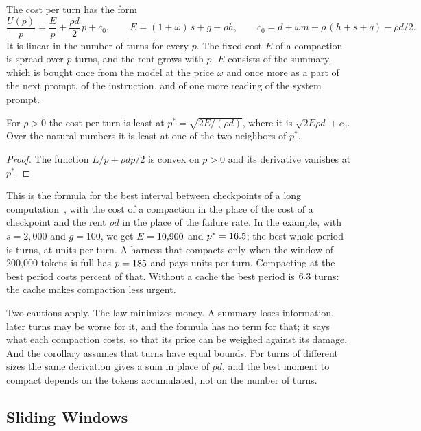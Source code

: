 \documentclass[acmsmall,nonacm,screen]{acmart}
\begin{document}
The cost per turn has the form
\[
\frac{U(p)}{p} = \frac{E}{p} + \frac{\rho d}{2}\,p + c_0,
\qquad E = (1+\omega)\,s + g + \rho h,
\qquad c_0 = d + \omega m + \rho\,(h + s + q) - \rho d/2 .
\]
It is linear in the number of turns for every $p$. The fixed cost $E$ of a compaction is
spread over $p$ turns, and the rent grows with $p$. $E$ consists of the summary, which is
bought once from the model at the price $\omega$ and once more as a part of the next prompt,
of the instruction, and of one more reading of the system prompt.

\begin{corollary}
\label{cor:sqrt}
For $\rho > 0$ the cost per turn is least at $p^* = \sqrt{2E/(\rho d)}$, where it is
$\sqrt{2E\rho d} + c_0$. Over the natural numbers it is least at one of the two neighbors of
$p^*$.
\end{corollary}

\begin{proof}
The function $E/p + \rho dp/2$ is convex on $p > 0$ and its derivative vanishes at $p^*$.
\end{proof}

This is the formula for the best interval between checkpoints of a long
computation~\cite{young1974}, with the cost of a compaction in the place of the cost of a
checkpoint and the rent $\rho d$ in the place of the failure rate. In the example, with
$s = 2{,}000$ and $g = 100$, we get $E = \text{10,900}$ and $p^* = 16.5$; the best whole period is
\exPbest{} turns, at \exPerTurnBest{} units per turn. A harness that compacts only when the
window of 200,000 tokens is full has $p = 185$ and pays \exPerTurnFull{} units per turn.
Compacting at the best period costs \exCompShare{} percent of that. Without a cache the best
period is $6.3$ turns: the cache makes compaction less urgent.

Two cautions apply. The law minimizes money. A summary loses information, later turns may be
worse for it, and the formula has no term for that; it says what each compaction costs, so
that its price can be weighed against its damage. And the corollary assumes that turns have
equal bounds. For turns of different sizes the same derivation gives a sum in place of
$pd$, and the best moment to compact depends on the tokens accumulated, not on the number of
turns.

\subsection{Sliding Windows}
\label{sec:window}
\end{document}

